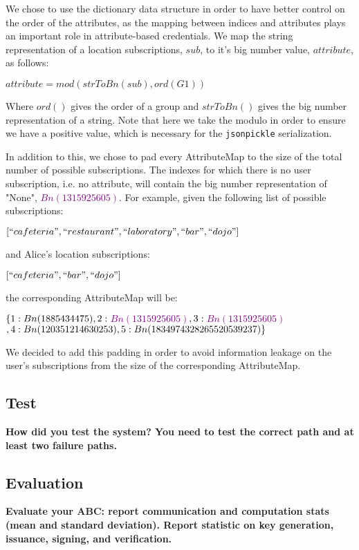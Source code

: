 \documentclass[10pt,conference,compsocconf]{IEEEtran}
\begin{document}
We chose to use the dictionary data structure in order to have better control on the order of the attributes, as the mapping between indices and attributes plays an important role in attribute-based credentials. We map the string representation of a location subscriptions, $sub$, to it's big number value, $attribute$, as follows: 

$attribute = mod(strToBn(sub), ord(G1))$

Where $ord()$ gives the order of a group and $strToBn()$ gives the big number representation of a string. Note that here we take the modulo in order to ensure we have a positive value, which is necessary for the \texttt{jsonpickle} serialization. 

In addition to this, we chose to pad every AttributeMap to the size of the total number of possible subscriptions. The indexes for which there is no user subscription, i.e. no attribute, will contain the big number representation of "None", \textcolor{purple}{$Bn(1315925605)$}. For example, given the following list of possible subscriptions: 

$[``cafeteria", ``restaurant", ``laboratory", ``bar", ``dojo"]$ 

\noindent
and Alice's location subscriptions:  

$[``cafeteria", ``bar", ``dojo"]$ 

\noindent
the corresponding AttributeMap will be:

\noindent
$\{1: Bn(1885434475), \\ 
2: $\textcolor{purple}{$\ Bn(1315925605)$}$, \\
3: $\textcolor{purple}{$\ Bn(1315925605)$}$, \\
4: Bn(120351214630253), \\
5: Bn(1834974328265520539237)\}$


We decided to add this padding in order to avoid information leakage on the user's subscriptions from the size of the corresponding AttributeMap. 

\subsection{Test}
\textbf{How did you test the system?
You need to test the correct path and at least two failure paths.}

\subsection{Evaluation}
\textbf{Evaluate your ABC: report communication and computation stats (mean and standard
deviation). Report statistic on key generation, issuance, signing, and
verification.}
\end{document}
